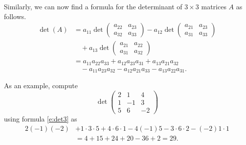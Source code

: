 \documentclass{ximera}
\begin{document}
Similarly, we can now find a formula for the determinant of
$3\times 3$ matrices $A$ as follows.
\begin{align}
\det(A) & = a_{11}
\det \left(\begin{array}{cc} a_{22} & a_{23}\\a_{32} & a_{33}
\end{array}\right) 
- a_{12}
\det \left(\begin{array}{cc} a_{21} & a_{23}\\a_{31} & a_{33}
           \end{array}\right)  \nonumber\\
  &\quad + a_{13}
\det\left(\begin{array}{cc} a_{21} & a_{22}\\a_{31} & a_{32}
\end{array}\right)  \nonumber\\
        & = a_{11}a_{22}a_{33} + a_{12}a_{23}a_{31} + a_{13}a_{21}a_{32}  \nonumber\\
  &\quad - a_{11}a_{23}a_{32} - a_{12}a_{21}a_{33} - a_{13}a_{22}a_{31}. \label{e:det3}
\end{align}  

As an example, compute
\[
\det\left(\begin{array}{rrr} 2 & 1 & 4\\ 1 & -1 & 3\\ 5 & 6 & -2
\end{array}\right) 
\]
using formula \eqref{e:det3} as
\begin{align*}
2(-1)(-2) & + 1\cdot3\cdot5 + 4\cdot6\cdot1 -4(-1)5 -3\cdot6\cdot2
            - (-2)1\cdot1 \\
  &= 4+15+24+20 -36 +2 = 29. 
\end{align*}
\end{document}
